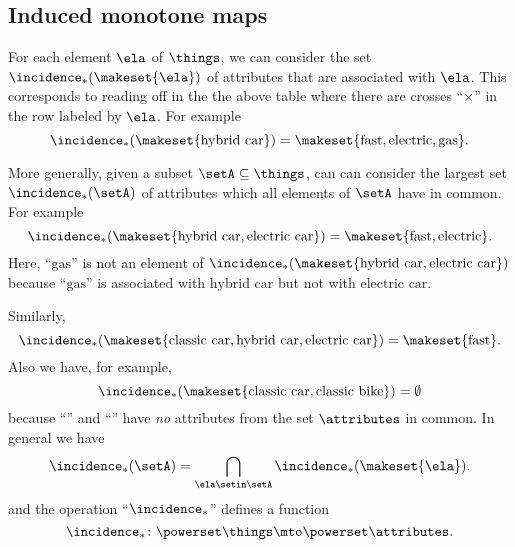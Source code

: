 \subsection{Induced monotone maps}

For each element $\ela$ of $\things$, we can consider the set $\incidence_*(\makeset{\ela})$ of attributes that are associated with $\ela$. This corresponds to reading off in the the above table where there are crosses ``$\times$'' in the row labeled by $\ela$. For example
\begin{equation}
\incidence_*(\makeset{\text{hybrid car}}) = \makeset{\text{fast}, \text{electric}, \text{gas}}. 
\end{equation}


More generally, given a subset $\setA \subseteq \things$, can can consider the largest set $\incidence_*(\setA)$ of attributes which all elements of $\setA$ have in common. For example 
\begin{equation}
\incidence_*(\makeset{\text{hybrid car}, \text{electric car}}) = \makeset{\text{fast}, \text{electric}}. 
\end{equation}
Here, ``$\text{gas}$'' is not an element of $\incidence_*(\makeset{\text{hybrid car}, \text{electric car}})$ because ``$\text{gas}$'' is associated with $\text{hybrid car}$ but not with $\text{electric car}$.  

Similarly, 
\begin{equation}
\incidence_*(\makeset{\text{classic car}, \text{hybrid car}, \text{electric car}}) = \makeset{\text{fast}}. 
\end{equation}
Also we have, for example, 
\begin{equation}
\incidence_*(\makeset{\text{classic car}, \text{classic bike}}) = \emptyset
\end{equation}
because ``'' and ``'' have \emph{no} attributes from the set $\attributes$ in common. In general we have 
\begin{equation}
\incidence_*(\setA) = \bigcap_{\ela \setin \setA} \incidence_*(\makeset{\ela}).
\end{equation}
and the operation ``$\incidence_*$'' defines a function 
\begin{equation}
\incidence_* \colon \powerset \things \mto \powerset \attributes.
\end{equation}

